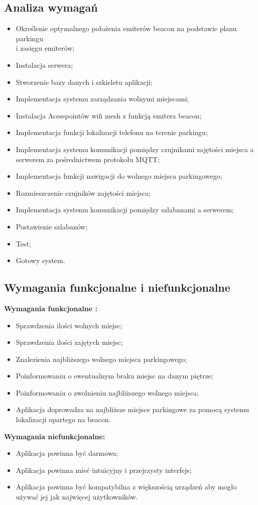 \documentclass[12pt,a4paper]{article}
\begin{document}
\subsection{Analiza wymagań}
\begin{itemize}
\item Określenie optymalnego położenia emiterów beacon na podstawie planu parkingu \\i zasięgu emiterów;
\item Instalacja serwera;
\item Stworzenie bazy danych i szkieletu aplikacji;
\item Implementacja systemu zarządzania wolnymi  miejscami;
\item Instalacja Acesspointów wifi mesh z funkcją emitera beacon;
\item Implementacja funkcji lokalizacji telefonu na terenie parkingu;
\item Implementacja systemu komunikacji pomiędzy czujnikami zajętości miejsca a serwerem za pośrednictwem protokołu MQTT;
\item Implementacja funkcji nawigacji do wolnego miejsca parkingowego;
\item Rozmieszczenie czujników zajętości miejsca;
\item Implementacja systemu komunikacji pomiędzy szlabanami a serwerem;
\item Postawienie szlabanów;
\item Test;
\item Gotowy system.
\end{itemize}

\newpage

\subsection{Wymagania funkcjonalne i niefunkcjonalne}
{\large \bf Wymagania funkcjonalne :}
\begin{itemize}
\item Sprawdzenia ilości wolnych miejsc;
\item Sprawdzenia ilości zajętych miejsc;
\item Znalezienia najbliższego wolnego miejsca parkingowego;
\item Poinformowaniu o ewentualnym braku miejsc na danym piętrze;
\item Poinformowaniu o zwolnieniu najbliższego wolnego miejsca;
\item Aplikacja doprowadza na najbliższe miejsce parkingowe za pomocą systemu lokalizacji opartego na beacon.
\end{itemize}
{\large \bf Wymagania niefunkcjonalne:}
\begin{itemize}
\item Aplikacja powinna być darmowa;
\item Aplikacja powinna mieć intuicyjny i przejrzysty interfejs;
\item Aplikacja powinna być kompatybilna z większością urządzeń aby mogło używać jej jak najwięcej użytkowników.
\end{itemize}
\end{document}
